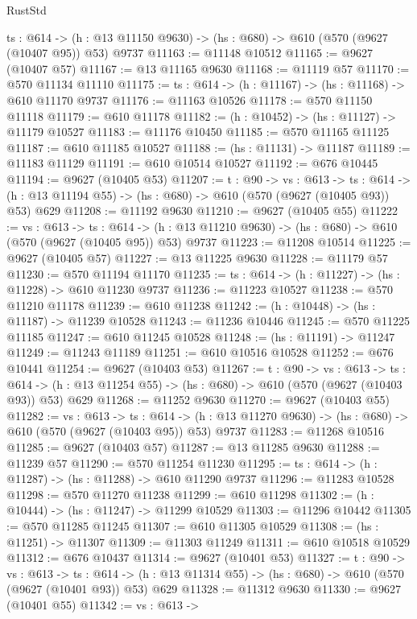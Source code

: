 \begin{lexlean}{RustStd}
\begin{coremodule}
  {ts : @614} -> (h : @13 @11150 @9630) -> (hs : @680) -> @610 (@570 (@9627 (@10407 @95)) @53) @9737
@11163 := @11148 @10512
@11165 := @9627 (@10407 @57)
@11167 := @13 @11165 @9630
@11168 := @11119 @57
@11170 := @570 @11134 @11110
@11175 := {ts : @614} -> (h : @11167) -> (hs : @11168) -> @610 @11170 @9737
@11176 := @11163 @10526
@11178 := @570 @11150 @11118
@11179 := @610 @11178
@11182 := (h : @10452) -> (hs : @11127) -> @11179 @10527
@11183 := @11176 @10450
@11185 := @570 @11165 @11125
@11187 := @610 @11185 @10527
@11188 := (hs : @11131) -> @11187
@11189 := @11183 @11129
@11191 := @610 @10514 @10527
@11192 := @676 @10445
@11194 := @9627 (@10405 @53)
@11207 := {t : @90} ->
  {vs : @613} ->
  {ts : @614} -> (h : @13 @11194 @55) -> (hs : @680) -> @610 (@570 (@9627 (@10405 @93)) @53) @629
@11208 := @11192 @9630
@11210 := @9627 (@10405 @55)
@11222 := {vs : @613} ->
  {ts : @614} -> (h : @13 @11210 @9630) -> (hs : @680) -> @610 (@570 (@9627 (@10405 @95)) @53) @9737
@11223 := @11208 @10514
@11225 := @9627 (@10405 @57)
@11227 := @13 @11225 @9630
@11228 := @11179 @57
@11230 := @570 @11194 @11170
@11235 := {ts : @614} -> (h : @11227) -> (hs : @11228) -> @610 @11230 @9737
@11236 := @11223 @10527
@11238 := @570 @11210 @11178
@11239 := @610 @11238
@11242 := (h : @10448) -> (hs : @11187) -> @11239 @10528
@11243 := @11236 @10446
@11245 := @570 @11225 @11185
@11247 := @610 @11245 @10528
@11248 := (hs : @11191) -> @11247
@11249 := @11243 @11189
@11251 := @610 @10516 @10528
@11252 := @676 @10441
@11254 := @9627 (@10403 @53)
@11267 := {t : @90} ->
  {vs : @613} ->
  {ts : @614} -> (h : @13 @11254 @55) -> (hs : @680) -> @610 (@570 (@9627 (@10403 @93)) @53) @629
@11268 := @11252 @9630
@11270 := @9627 (@10403 @55)
@11282 := {vs : @613} ->
  {ts : @614} -> (h : @13 @11270 @9630) -> (hs : @680) -> @610 (@570 (@9627 (@10403 @95)) @53) @9737
@11283 := @11268 @10516
@11285 := @9627 (@10403 @57)
@11287 := @13 @11285 @9630
@11288 := @11239 @57
@11290 := @570 @11254 @11230
@11295 := {ts : @614} -> (h : @11287) -> (hs : @11288) -> @610 @11290 @9737
@11296 := @11283 @10528
@11298 := @570 @11270 @11238
@11299 := @610 @11298
@11302 := (h : @10444) -> (hs : @11247) -> @11299 @10529
@11303 := @11296 @10442
@11305 := @570 @11285 @11245
@11307 := @610 @11305 @10529
@11308 := (hs : @11251) -> @11307
@11309 := @11303 @11249
@11311 := @610 @10518 @10529
@11312 := @676 @10437
@11314 := @9627 (@10401 @53)
@11327 := {t : @90} ->
  {vs : @613} ->
  {ts : @614} -> (h : @13 @11314 @55) -> (hs : @680) -> @610 (@570 (@9627 (@10401 @93)) @53) @629
@11328 := @11312 @9630
@11330 := @9627 (@10401 @55)
@11342 := {vs : @613} ->

\end{coremodule}
\end{lexlean}
